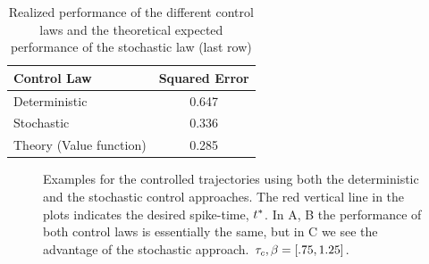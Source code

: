 \documentclass{article}
\begin{document}
\begin{table}[h] 
\centering
\begin{tabular}{lc}
Control Law & Squared Error \\
\hline
Deterministic &  0.647 \\
Stochastic &  0.336\\
Theory (Value function) & 0.285
\end{tabular}
\caption{Realized performance of the different control laws and the theoretical
expected performance of the stochastic law (last row)}
\label{tab:realized_avg_errors_det_vs_stoch}
\end{table}

\begin{figure}[h]
\begin{center}
\caption[]{Examples for the controlled trajectories using both the deterministic
and the stochastic control approaches. The red vertical line in the plots
indicates the desired spike-time, ${ t^* }$. In A, B the performance of both
control laws is essentially the same, but in C we see the advantage of the
stochastic approach. ${ \tau_{c} }, {\beta} = [.75, 1.25]$.}
\label{fig:control_trajectories_examples}
\end{center}
\end{figure}
\end{document}
